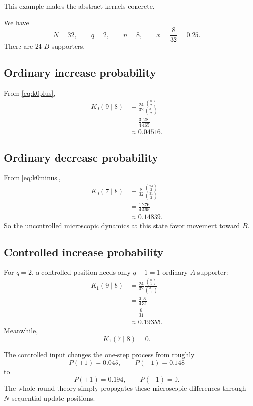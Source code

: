 \documentclass[11pt,a4paper]{article}
\newcommand{\1}{\mathbbm{1}}
\begin{document}
This example makes the abstract kernels concrete.

We have
\[
N=32,\qquad q=2,\qquad n=8,\qquad x=\frac{8}{32}=0.25.
\]
There are $24$ $B$ supporters.

\subsection{Ordinary increase probability}

From \cref{eq:k0plus},
\begin{align}
K_0(9\mid8)
&=\frac{24}{32}\frac{\binom82}{\binom{31}{2}}\\
&=\frac34\frac{28}{465}\\
&\approx 0.04516.
\end{align}

\subsection{Ordinary decrease probability}

From \cref{eq:k0minus},
\begin{align}
K_0(7\mid8)
&=\frac8{32}\frac{\binom{24}{2}}{\binom{31}{2}}\\
&=\frac14\frac{276}{465}\\
&\approx 0.14839.
\end{align}
So the uncontrolled microscopic dynamics at this state favor movement toward $B$.

\subsection{Controlled increase probability}

For $q=2$, a controlled position needs only $q-1=1$ ordinary $A$ supporter:
\begin{align}
K_1(9\mid8)
&=\frac{24}{32}\frac{\binom81}{\binom{31}{1}}\\
&=\frac34\frac8{31}\\
&=\frac6{31}\\
&\approx 0.19355.
\end{align}
Meanwhile,
\[
K_1(7\mid8)=0.
\]

\begin{logicbox}
The controlled input changes the one-step process from roughly
\[
P(+1)=0.045,\qquad P(-1)=0.148
\]
to
\[
P(+1)=0.194,\qquad P(-1)=0.
\]
The whole-round theory simply propagates these microscopic differences through $N$ sequential update positions.
\end{logicbox}
\end{document}
